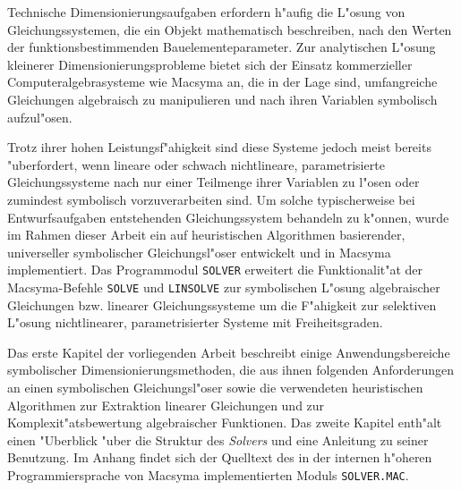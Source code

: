 Technische Dimensionierungsaufgaben erfordern h"aufig die L"osung von
Gleichungssystemen, die ein Objekt mathematisch beschreiben, nach den Werten
der funktionsbestimmenden Bauelementeparameter. Zur analytischen L"osung
kleinerer Dimensionierungsprobleme bietet sich der Einsatz kommerzieller
Computeralgebrasysteme wie Macsyma \cite{Macsyma} an, die in der Lage sind,
umfangreiche Gleichungen algebraisch zu manipulieren und nach ihren Variablen
symbolisch aufzul"osen.

Trotz ihrer hohen Leistungsf"ahigkeit sind diese Systeme jedoch meist
bereits "uberfordert, wenn lineare oder schwach nichtlineare, parametrisierte
Gleichungssysteme nach nur einer Teilmenge ihrer Variablen zu l"osen oder
zumindest symbolisch vorzuverarbeiten sind. Um solche typischerweise bei
Entwurfsaufgaben entstehenden Gleichungssystem behandeln zu k"onnen, wurde im
Rahmen dieser Arbeit ein auf heuristischen Algorithmen basierender,
universeller symbolischer Gleichungsl"oser entwickelt und in Macsyma
implementiert. Das Programmodul \verb+SOLVER+ erweitert die Funktionalit"at
der Macsyma-Befehle \verb+SOLVE+ und \verb+LINSOLVE+ zur symbolischen L"osung
algebraischer Gleichungen bzw. linearer Gleichungssysteme um die F"ahigkeit
zur selektiven L"osung nichtlinearer, parametrisierter Systeme mit
Freiheitsgraden.

Das erste Kapitel der vorliegenden Arbeit beschreibt einige
Anwendungsbereiche symbolischer Dimensionierungsmethoden, die aus ihnen
folgenden Anforderungen an einen symbolischen Gleichungsl"oser sowie die
verwendeten heuristischen Algorithmen zur Extraktion linearer Gleichungen und
zur Komplexit"atsbewertung algebraischer Funktionen. Das zweite Kapitel
enth"alt einen "Uberblick "uber die Struktur des {\em Solvers} und eine
Anleitung zu seiner Benutzung. Im Anhang findet sich der Quelltext des in der
internen h"oheren Programmiersprache von Macsyma implementierten Moduls
\verb+SOLVER.MAC+.
